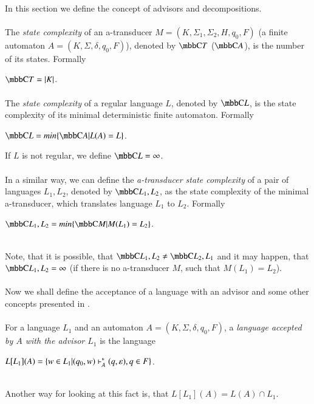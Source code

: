 \paragraph{}
In this section we define the concept of advisors and decompositions.

\paragraph{}
 The \emph{state complexity} of an a-transducer $M = (K, \Sigma_1, \Sigma_2, H, q_0, F)$ (a finite automaton $A = (K, \Sigma, \delta, q_0, F)$), denoted by $\C{T}$ ($\C{A}$), is the number of its states. Formally \\
\centerline{$\C{T} = |K|$.}

\paragraph{}
 The \emph{state complexity} of a regular language $L$, denoted by $\C{L}$, is the state complexity of its minimal deterministic finite automaton. Formally \\
\centerline{$\C{L} = min\{ \C{A}|L(A) = L\} $.}

If $L$ is not regular, we define $\C{L} = \infty $.

\paragraph{}
 In a similar way, we can define the \emph{a-transducer state complexity} of a pair of languages $L_1, L_2$, denoted by $\C{L_1,L_2}$, as the state complexity of the minimal a-transducer, which translates language $L_1$ to $L_2$. Formally \\
\centerline{$\C{L_1, L_2} = min\{ \C{M}|M(L_1) = L_2\} $.} \\
Note, that it is possible, that $\C{L_1,L_2} \neq \C{L_2,L_1}$ and it may happen, that $\C{L_1,L_2} \allowbreak  = \infty$ (if there is no a-transducer $M$, such that $M(L_1) = L_2$).

\paragraph{}
Now we shall define the acceptance of a language with an advisor and some other concepts presented in \cite{Gazi}.

\paragraph{}
 For a language $L_1$ and an automaton $A = (K, \Sigma, \delta, q_0, F)$, a \emph{language accepted by $A$ with the advisor $L_1$} is the language \\
\centerline{$L[L_1](A) =  \{ w \in L_1 | (q_0, w) \vdash^\ast_A (q, \varepsilon), q \in F \}$.}\\
Another way for looking at this fact is, that $L[L_1](A) = L(A) \cap L_1$.
 
